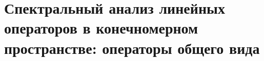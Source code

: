 \section{Спектральный анализ линейных операторов в конечномерном пространстве: операторы общего вида}




